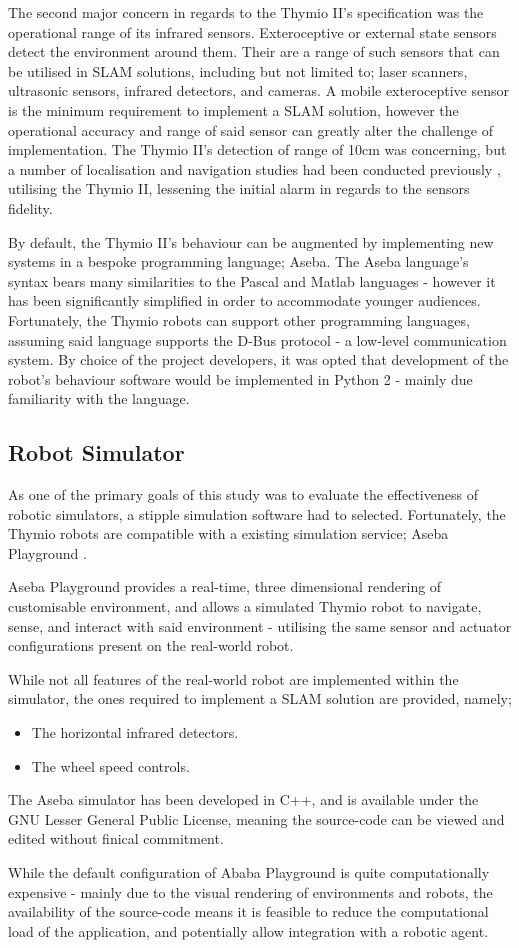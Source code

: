 The second major concern in regards to the Thymio II's specification was the
operational range of its infrared sensors.
Exteroceptive or external state sensors detect the environment around
them.
Their are a range of such sensors that can be utilised in SLAM solutions,
including but not limited to; laser scanners, ultrasonic sensors, infrared
detectors, and cameras.
A mobile exteroceptive sensor is the minimum requirement to implement a SLAM
solution, however the operational accuracy and range of said sensor can
greatly alter the challenge of implementation.
The Thymio II's detection of range of 10cm was concerning, but a number of
localisation and navigation studies had been conducted previously
\cite{Wang2016}, utilising the Thymio II, lessening the initial alarm in
regards to the sensors fidelity.

By default, the Thymio II's behaviour can be augmented by implementing
new systems in a bespoke programming language; Aseba.
The Aseba language's syntax bears many similarities to the Pascal and
Matlab languages - however it has been significantly simplified in order to
accommodate younger audiences.
Fortunately, the Thymio robots can support other programming languages,
assuming said language supports the D-Bus protocol - a low-level communication
system.
By choice of the project developers, it was opted that development of the
robot's behaviour software would be implemented in Python 2 - mainly due
familiarity with the language.

\subsection{Robot Simulator}
As one of the primary goals of this study was to evaluate the effectiveness of
robotic simulators, a stipple simulation software had to selected.
Fortunately, the Thymio robots are compatible with a existing simulation
service; Aseba Playground \cite{aseba-community}.

Aseba Playground provides a real-time, three dimensional rendering of
customisable environment, and allows a simulated Thymio robot to navigate,
sense, and interact with said environment - utilising the same sensor and
actuator configurations present on the real-world robot.

While not all features of the real-world robot are implemented within the
simulator, the ones required to implement a SLAM solution are provided, namely;

\begin{itemize}
\item The horizontal infrared detectors.
\item The wheel speed controls.
\end{itemize}

The Aseba simulator has been developed in C++, and is available under the GNU
Lesser General Public License, meaning the source-code can be viewed and
edited without finical commitment.

While the default configuration of Ababa Playground is quite computationally
expensive - mainly due to the visual rendering of environments and robots, the
availability of the source-code means it is feasible to reduce the
computational load of the application, and potentially allow integration with a
robotic agent.
